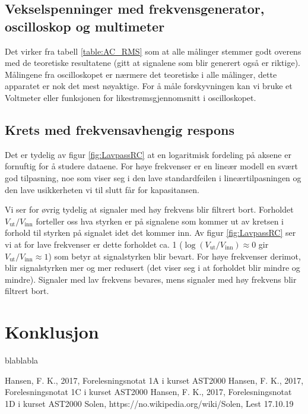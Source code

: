 \documentclass[reprint, english,notitlepage]{revtex4-1}  %
\begin{document}
\subsection{Vekselspenninger med frekvensgenerator, oscilloskop og multimeter}

Det virker fra tabell \ref{table:AC_RMS} som at alle målinger stemmer godt overens med de teoretiske resultatene (gitt at signalene som blir generert også er riktige). Målingene fra oscilloskopet er nærmere det teoretiske i alle målinger, dette apparatet er nok det mest nøyaktige. For å måle forskyvningen kan vi bruke et Voltmeter eller funksjonen for likestrømsgjennomsnitt i oscilloskopet.


\subsection{Krets med frekvensavhengig respons}

Det er tydelig av figur \ref{fig:LavpassRC} at en logaritmisk fordeling på aksene er fornuftig for å studere dataene. For høye frekvenser er en lineær modell en svært god tilpasning, noe som viser seg i den lave standardfeilen i lineærtilpasningen og den lave usikkerheten vi til slutt får for kapasitansen.

Vi ser for øvrig tydelig at signaler med høy frekvens blir filtrert bort. Forholdet $V_{\text{ut}}/V_{\text{inn}}$ forteller oss hva styrken er på signalene som kommer ut av kretsen i forhold til styrken på signalet idet det kommer inn. Av figur \ref{fig:LavpassRC} ser vi at for lave frekvenser er dette forholdet ca. 1 ($\log (V_{\text{ut}}/V_{\text{inn}}) \approx 0$ gir $V_{\text{ut}}/V_{\text{inn}} \approx 1$) som betyr at signalstyrken blir bevart. For høye frekvenser derimot, blir signalstyrken mer og mer redusert (det viser seg i at forholdet blir mindre og mindre). Signaler med lav frekvens bevares, mens signaler med høy frekvens blir filtrert bort. 



\section{Konklusjon}
blablabla



\onecolumngrid
\vspace{1cm} %


\begin{thebibliography}{}
 Hansen, F. K.,  2017, Forelesningsnotat 1A i kurset AST2000
 Hansen, F. K.,  2017, Forelesningsnotat 1C i kurset AST2000
 Hansen, F. K.,  2017, Forelesningsnotat 1D i kurset AST2000
 Solen, https://no.wikipedia.org/wiki/Solen, Lest 17.10.19

\end{thebibliography}
\end{document}
